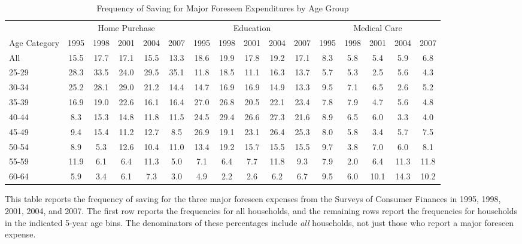 \documentclass[fleqccn,12pt]{article}
\begin{document}
\begin{sidewaystable}
\caption{Frequency of Saving for Major Foreseen Expenditures by Age Group\label{table:ExpenditureFrequencyByAge}}
\bigskip
\begin{center}
%
\begin{tabular}{l|*{ 5}{c}|*{ 5}{c}|*{ 5}{c}}
 & \multicolumn{5}{c}{Home Purchase} & \multicolumn{5}{c}{Education} & \multicolumn{5}{c}{Medical Care}\\
Age Category  & 1995 & 1998 & 2001 & 2004 & 2007 & 1995 & 1998 & 2001 & 2004 & 2007 & 1995 & 1998 & 2001 & 2004 & 2007\\ \hline
\hspace{12pt}All&15.5&17.7&17.1&15.5&13.3&18.6&19.9&17.8&19.2&17.1&8.3&5.8&5.4&5.9&6.8\\
\hspace{12pt}25-29&28.3&33.5&24.0&29.5&35.1&11.8&18.5&11.1&16.3&13.7&5.7&5.3&2.5&5.6&4.3\\
\hspace{12pt}30-34&25.2&28.1&29.0&21.2&14.4&14.7&16.9&16.9&14.9&13.3&9.5&7.1&6.5&2.6&5.2\\
\hspace{12pt}35-39&16.9&19.0&22.6&16.1&16.4&27.0&26.8&20.5&22.1&23.4&7.8&7.9&4.7&5.6&4.8\\
\hspace{12pt}40-44&8.3&15.3&14.8&11.8&11.5&24.5&29.4&26.6&27.3&21.6&8.9&6.5&6.0&3.3&4.0\\
\hspace{12pt}45-49&9.4&15.4&11.2&12.7&8.5&26.9&19.1&23.1&26.4&25.3&8.0&5.8&3.4&5.7&7.5\\
\hspace{12pt}50-54&8.9&5.3&12.6&10.4&11.0&13.4&19.2&15.7&15.5&15.5&9.7&3.8&7.0&6.0&8.1\\
\hspace{12pt}55-59&11.9&6.1&6.4&11.3&5.0&7.1&6.4&7.7&11.8&9.3&7.9&2.0&6.4&11.3&11.8\\
\hspace{12pt}60-64&5.9&3.4&6.1&7.3&3.0&4.9&2.2&2.6&6.2&6.7&9.5&6.0&10.1&14.3&10.2\\
\end{tabular}
\end{center}

\bigskip

\noindent \footnotesize This table reports the frequency of saving for the three major foreseen expenses from the Surveys of Consumer Finances in 1995, 1998, 2001, 2004, and 2007. The first row reports the frequencies for all households, and the remaining rows report the frequencies for households in the indicated 5-year age bins. The denominators of these percentages include \emph{all} households, not just those who report a major foreseen expense.
\normalsize
\end{sidewaystable}
\end{document}
